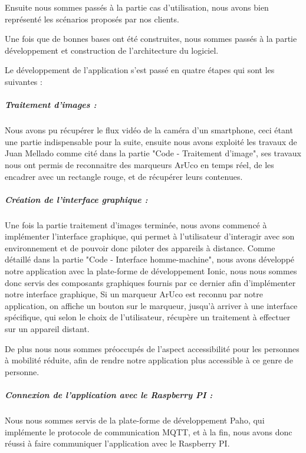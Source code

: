 \documentclass[12pt,a4paper]{article}
\begin{document}
Ensuite nous sommes passés à la partie cas d'utilisation, nous avons bien représenté les scénarios proposés par nos clients. \par

Une fois que de bonnes bases ont été construites, nous sommes passés à la partie développement et construction de l'architecture du logiciel. \par

Le développement de l'application s'est passé en quatre étapes qui sont les suivantes : \par

\subparagraph{Traitement d'images :}
Nous avons pu récupérer le flux vidéo de la caméra d'un smartphone, ceci étant une partie indispensable pour la suite, ensuite nous avons exploité les travaux de Juan Mellado comme cité dans la partie "Code - Traitement d'image", ses travaux nous ont permis de reconnaitre des marqueurs ArUco en temps réel, de les encadrer avec un rectangle rouge, et de récupérer leurs contenues.\par

\subparagraph{Création de l'interface graphique :}

Une fois la partie traitement d'images terminée, nous avons commencé à implémenter l'interface graphique, qui permet à l'utilisateur d'interagir avec son environnement et de pouvoir donc piloter des appareils à distance. Comme détaillé dans la partie "Code - Interface homme-machine", nous avons développé notre application avec la plate-forme de développement Ionic, nous nous sommes donc servis des composants graphiques fournis par ce dernier afin d'implémenter notre interface graphique, Si un marqueur ArUco est reconnu par notre application, on affiche un bouton sur le marqueur, jusqu'à arriver à une interface spécifique, qui selon le choix de l'utilisateur, récupère un traitement à effectuer sur un appareil distant.\par

De plus nous nous sommes préoccupés de l'aspect accessibilité pour les personnes à mobilité réduite, afin de rendre notre application plus accessible à ce genre de personne.\par

\subparagraph{Connexion de l'application avec le Raspberry PI :}

Nous nous sommes servis de la plate-forme de développement Paho, qui implémente le protocole de communication MQTT, et à la fin, nous avons donc réussi à faire communiquer l'application avec le Raspberry PI.\par
\end{document}
